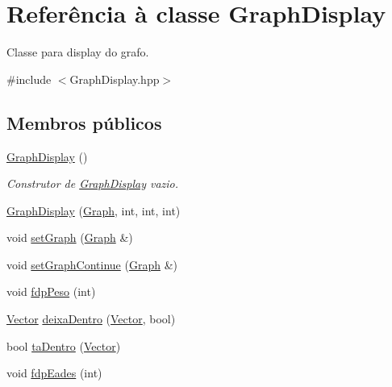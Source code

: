 \hypertarget{classGraphDisplay}{}\section{Referência à classe Graph\+Display}
\label{classGraphDisplay}


Classe para display do grafo.  




{\ttfamily \#include $<$Graph\+Display.\+hpp$>$}

\subsection*{Membros públicos}
\begin{DoxyCompactItemize}
\item 
\mbox{\label{classGraphDisplay_ac208e50545ccedbca810822743040f48}} 
\mbox{\hyperlink{classGraphDisplay_ac208e50545ccedbca810822743040f48}{Graph\+Display}} ()
\begin{DoxyCompactList}\small\item\em Construtor de \mbox{\hyperlink{classGraphDisplay}{Graph\+Display}} vazio. \end{DoxyCompactList}\item 
\mbox{\hyperlink{classGraphDisplay_adea7ab840d8aa0646eab49709569143f}{Graph\+Display}} (\mbox{\hyperlink{classGraph}{Graph}}, int, int, int)
\item 
void \mbox{\hyperlink{classGraphDisplay_a496ee74caea737ce5f93f9d23474eb6d}{set\+Graph}} (\mbox{\hyperlink{classGraph}{Graph}} \&)
\item 
void \mbox{\hyperlink{classGraphDisplay_ab90cdfe3694a8a34767dc50268cf5a50}{set\+Graph\+Continue}} (\mbox{\hyperlink{classGraph}{Graph}} \&)
\item 
void \mbox{\hyperlink{classGraphDisplay_a9d55e916fea8b749eaee51def8d004d3}{fdp\+Peso}} (int)
\item 
\mbox{\hyperlink{classVector}{Vector}} \mbox{\hyperlink{classGraphDisplay_a694d361743f700a6250d578978aefab1}{deixa\+Dentro}} (\mbox{\hyperlink{classVector}{Vector}}, bool)
\item 
bool \mbox{\hyperlink{classGraphDisplay_a6d822244f05f8a0dd1e40a40d13294bf}{ta\+Dentro}} (\mbox{\hyperlink{classVector}{Vector}})
\item 
void \mbox{\hyperlink{classGraphDisplay_af709c8e4e8c0e270dbe5edcab2c8e350}{fdp\+Eades}} (int)
\item 

\end{DoxyCompactItemize}
